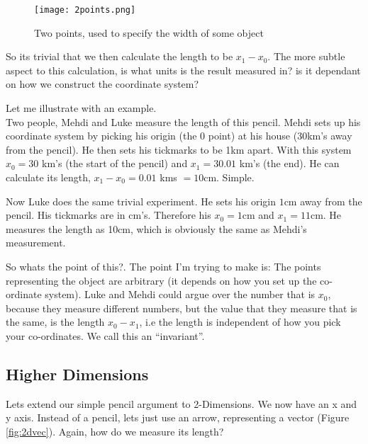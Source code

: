\begin{figure}[h]
  \centering
  \texttt{[image: 2points.png]}
  \caption{Two points, used to specify the width of some object}
  \label{fig:pp}
\end{figure}

So its trivial that we then calculate the length to be $x_1 - x_0$. The more subtle aspect to this calculation, is what units is the result measured in? is it dependant on how we construct the coordinate system? 

Let me illustrate with an example. \\

Two people, Mehdi and Luke measure the length of this pencil. Mehdi sets up his coordinate system by picking his origin (the 0 point) at his house (30km's away from the pencil). He then sets his tickmarks to be 1km apart. With this system $x_0 = 30$ km's (the start of the pencil) and $x_1 = 30.01$ km's (the end).  He can calculate its length, $x_1 - x_0 = 0.01$ kms $ = 10$cm. Simple. 

Now Luke does the same trivial experiment. He sets his origin $1$cm away from the pencil. His tickmarks are in cm's. Therefore his $x_0 = 1$cm and $x_1 = 11$cm. He measures the length as 10cm, which is obviously the same as Mehdi's measurement. 

So whats the point of this?. The point I'm trying to make is: The points representing the object are arbitrary (it depends on how you set up the co-ordinate system). Luke and Mehdi could argue over the number that is $x_0$, because they measure different numbers, but the value that they measure that is the same, is the length $x_0 - x_1$, i.e the length is independent of how you pick your co-ordinates. We call this an ``invariant''. 


  \subsection{Higher Dimensions}
  Lets extend our simple pencil argument to 2-Dimensions. We now have an x and y axis. Instead of a pencil, lets just use an arrow, representing a vector (Figure \ref{fig:2dvec}). Again, how do we measure its length? 

